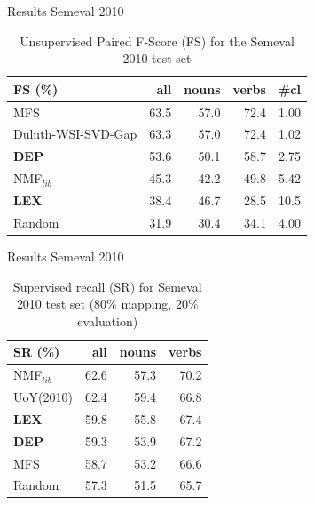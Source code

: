 \begin{frame}{Results Semeval 2010}
\begin{table}[]
\centering

\begin{tabular}{@{}lrrrr@{}}
\toprule
\textbf{FS (\%)} & \textbf{all} & \textbf{nouns} & \textbf{verbs} & \textbf{\#cl} \\ \midrule
MFS & 63.5 & 57.0 & 72.4 & 1.00 \\
Duluth-WSI-SVD-Gap & 63.3 & 57.0 & 72.4 & 1.02 \\
\textbf{DEP} & 53.6 & 50.1 & 58.7 & 2.75 \\
NMF$_{lib}$&45.3&42.2&49.8&5.42\\
\textbf{LEX} & 38.4 & 46.7 & 28.5 & 10.5 \\
Random & 31.9 & 30.4 & 34.1 & 4.00 \\ \bottomrule
\end{tabular}
\caption{Unsupervised Paired F-Score (FS) for the Semeval 2010 test set}
\label{tab:sem2010_FS}
\end{table}
\end{frame}

\begin{frame}{Results Semeval 2010}
\begin{table}
\centering

\begin{tabular}{@{}lrrr@{}}
\toprule
\textbf{SR (\%)} & \textbf{all} & \textbf{nouns} & \textbf{verbs} \\ \midrule
NMF$_{lib}$&62.6&57.3&70.2\\
UoY(2010) & 62.4 & 59.4 & 66.8 \\

\textbf{LEX} & 59.8 & 55.8 & 67.4 \\
\textbf{DEP} & 59.3 & 53.9 & 67.2 \\
MFS & 58.7 & 53.2 & 66.6 \\
Random & 57.3 & 51.5 & 65.7 \\ \bottomrule

\end{tabular}

\caption{Supervised recall (SR) for Semeval 2010 test set (80\% mapping, 20\% evaluation)}
\label{tab:sem2010_SR}
\end{table}
\end{frame}


